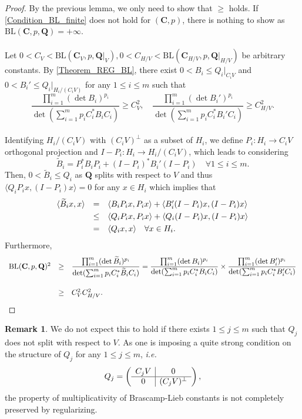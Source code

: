 \documentclass[11pt,a4paper,reqno]{amsart}
\numberwithin{equation}{section}
\theoremstyle{definition}
\newtheorem{remark}[theorem]{Remark}
\newcommand{\nm}{\noalign{\smallskip}}
\newcommand{\ds}{\displaystyle}
\renewcommand{\tilde}{\widetilde}
\newcommand{\<}{\ensuremath \leq}
\renewcommand{\>}{\ensuremath \geq}
\renewcommand{\tilde}{\widetilde}
\begin{document}
\begin{proof}
    By the previous lemma, we only need to show that $\geq$ holds.
    If \cref{Condition_BL_finite} does not hold for $(\textbf{C},p)$, there is nothing to show as $\mathrm{BL}(\textbf{C},p,\textbf{Q})=+\infty.$ \\ \hfill \\ Let $0<C_V<\mathrm{BL}(\textbf{C}_V,p,\textbf{Q}|_V), 0<C_{H/V}<\mathrm{BL}(\textbf{C}_{H/V},p,\textbf{Q}|_{H/V})$ be arbitrary constants. By \cref{Theorem_REG_BL}, there exist $0<B_i \leq Q_i|_{C_iV}$ and $0<B_i' \leq Q_i|_{H_i/(C_iV)}$ for any $1 \leq i \leq m$ such that $$\frac{\prod_{i=1}^m (\det B_i)^{p_i}}{\det(\sum_{i=1}^m p_iC_i^*B_iC_i)} \geq C_V^2, \quad \frac{\prod_{i=1}^m (\det B_i')^{p_i}}{\det(\sum_{i=1}^m p_iC_i^*B_i'C_i)} \geq C_{H/V}^2.$$ \hfill \\ Identifying $H_i/(C_iV)$ with $(C_iV)^\perp$ as a subset of $H_i$, we define $P_i: H_i \rightarrow C_iV$ orthogonal projection and $I-P_i: H_i \rightarrow H_i/(C_iV)$, which leads to considering $$\tilde B_i=P_i^* B_iP_i+(I-P_i)^*B_i'(I-P_i) \quad \forall 1 \leq i \leq m.$$ Then, $0<\tilde B_i \leq Q_i$ as $\textbf{Q}$ splits with respect to $V$ and thus $\langle Q_iP_ix,(I-P_i)x\rangle=0$ for any $x \in H_i$ which implies that $$\begin{array}{lll} \langle \tilde B_ix,x\rangle &=& \langle B_iP_ix,P_ix\rangle+\langle B_i'(I-P_i)x,(I-P_i)x\rangle \\
    \nm 
    &\leq& \langle Q_iP_ix,P_ix\rangle+\langle Q_i(I-P_i)x,(I-P_i)x\rangle \\
    \nm 
    &=& \langle Q_ix,x\rangle \quad \forall x \in H_i.
    \end{array}$$ 
    Furthermore, $$\begin{array}{lll} 
    \mathrm{BL}(\textbf{C},p,\textbf{Q})^2 &\geq& \ds \frac{\prod_{i=1}^m (\det \tilde B_i)^{p_i}}{\det(\sum_{i=1}^m p_iC_i^*\tilde B_iC_i)}=\frac{\prod_{i=1}^m (\det B_i)^{p_i}}{\det(\sum_{i=1}^m p_iC_i^*B_iC_i)} \times \frac{\prod_{i=1}^m (\det B_i')^{p_i}}{\det(\sum_{i=1}^m p_iC_i^*B_i'C_i)} \\ \\
    \nm 
    &\geq& C_V^2C_{H/V}^2. \end{array}$$
\end{proof}

\begin{remark}
    We do not expect this to hold if there exists $1 \leq j \leq m$ such that $Q_j$ does not split with respect to $V.$ As one is imposing a quite strong condition on the structure of $Q_j$ for any $1 \leq j \leq m$, \textit{i.e.} $$Q_j=\left(\begin{array}{ c | c } 
    C_jV & 0 \\
    \hline 
    0 & (C_jV)^\perp
    \end{array} \right),$$ the property of multiplicativity of Brascamp-Lieb constants is not completely preserved by regularizing.
\end{remark}
\end{document}
